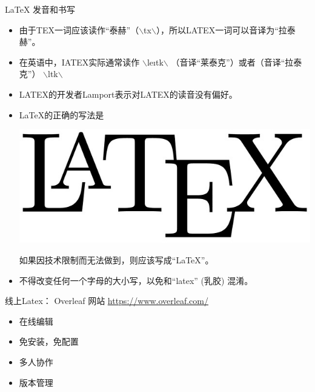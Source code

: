 \documentclass[13pt]{ctexbeamer}
\begin{document}
\begin{frame}{LaTeX 发音和书写}
	\begin{itemize}
\item 	由于TEX一词应该读作“泰赫”（$\backslash$t\textepsilon x$\backslash$），所以LATEX一词可以音译为“拉泰赫”。
\item
	在英语中，IATEX实际通常读作
$\backslash$le\i t\textepsilon k$\backslash$
（音译“莱泰克”）或者（音译“拉泰克”）
$\backslash$l\textscripta\textlengthmark t\textepsilon k$\backslash$
\item
	LATEX的开发者Lamport表示对LATEX的读音没有偏好。
		\end{itemize}
	\vspace{15pt}
		\begin{itemize}
\item
LaTeX的正确的写法是
\begin{center}
\includegraphics[scale=0.08]{LATEX.jpg}
\end{center}
如果因技术限制而无法做到，则应该写成“LaTeX”。
\item
不得改变任何一个字母的大小写，以免和“latex” (乳胶) 混淆。
	\end{itemize}
\end{frame}






\begin{frame}{线上Latex：  Overleaf}
    网站
    \href{https://www.overleaf.com?r=4c8832b9&rm=d&rs=b
    }{https://www.overleaf.com/
    }


    \begin{itemize}
        \item 在线编辑

        \item 免安装，免配置

        \item 多人协作

        \item 版本管理
    \end{itemize}
\end{frame}
\end{document}

